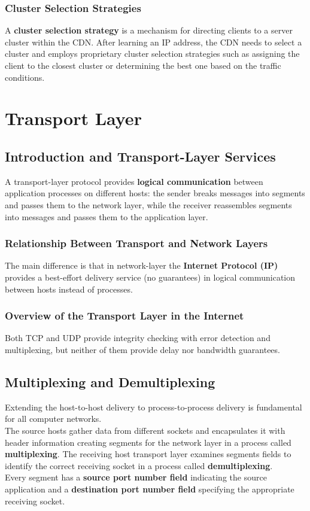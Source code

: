 \documentclass{article}
\begin{document}
\subsubsection{Cluster Selection Strategies}
A \textbf{cluster selection strategy} is a mechanism for directing clients to a server cluster within the CDN. After learning an IP address, the CDN needs to select a cluster and employs proprietary cluster selection strategies such as assigning the client to the closest cluster or determining the best one based on the traffic conditions.

\newpage

\section{Transport Layer}

\subsection{Introduction and Transport-Layer Services}
A transport-layer protocol provides \textbf{logical communication} between application processes on different hosts: the sender breaks messages into segments and passes them to the network layer, while the receiver reassembles segments into messages and passes them to the application layer.
\subsubsection{Relationship Between Transport and Network Layers}
The main difference is that in network-layer the \textbf{Internet Protocol (IP)} provides a best-effort delivery service (no guarantees) in logical communication between hosts instead of processes.
\subsubsection{Overview of the Transport Layer in the Internet}
Both TCP and UDP provide integrity checking with error detection and multiplexing, but neither of them provide delay nor bandwidth guarantees.

\subsection{Multiplexing and Demultiplexing}
Extending the host-to-host delivery to process-to-process delivery is fundamental for all computer networks. \\
The source hosts gather data from different sockets and encapsulates it with header information creating segments for the network layer in a process called \textbf{multiplexing}. The receiving host transport layer examines segments fields to identify the correct receiving socket in a process called \textbf{demultiplexing}. \\
Every segment has a \textbf{source port number field} indicating the source application and a \textbf{destination port number field} specifying the appropriate receiving socket.
\end{document}
